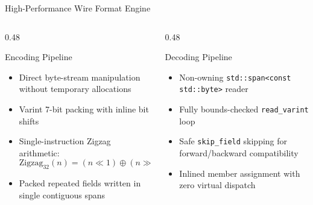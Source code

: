\documentclass[aspectratio=169,10pt]{beamer}
\begin{document}
\begin{frame}{High-Performance Wire Format Engine}
  \begin{columns}[T]
    \begin{column}{0.48\textwidth}
      \begin{block}{Encoding Pipeline}
        \begin{itemize}
          \item Direct byte-stream manipulation without temporary allocations
          \item Varint 7-bit packing with inline bit shifts
          \item Single-instruction Zigzag arithmetic:
            $$\text{Zigzag}_{32}(n) = (n \ll 1) \oplus (n \gg 31)$$
          \item Packed repeated fields written in single contiguous spans
        \end{itemize}
      \end{block}
    \end{column}

    \begin{column}{0.48\textwidth}
      \begin{block}{Decoding Pipeline}
        \begin{itemize}
          \item Non-owning \texttt{std::span<const std::byte>} reader
          \item Fully bounds-checked \texttt{read\_varint} loop
          \item Safe \texttt{skip\_field} skipping for forward/backward compatibility
          \item Inlined member assignment with zero virtual dispatch
        \end{itemize}
      \end{block}
    \end{column}
  \end{columns}
\end{frame}
\end{document}
